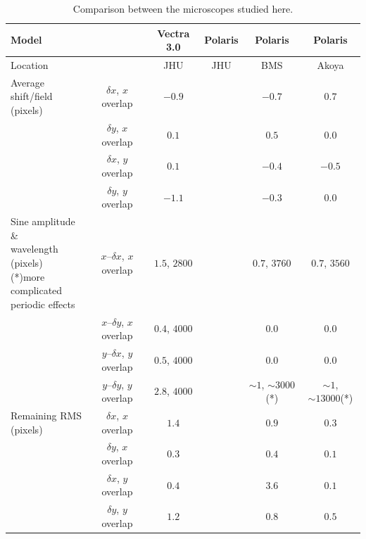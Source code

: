 \documentclass{article}
\begin{document}
\begin{table}[ht]
	\centering
	\begin{tabular}{|l|c|c|c|c|c|}
	\hline
	\multicolumn{2}{|l|}{Model} & Vectra 3.0 & Polaris & Polaris & Polaris \\\hline
	\multicolumn{2}{|l|}{Location} & JHU & JHU & BMS & Akoya \\\hline
	\multirowcell{3}[0pt][l]{Average shift/field \\ (pixels)}
	& $\delta x$, $x$ overlap & $-0.9$ & & $-0.7$ & $0.7$ \\\cline{2-6}
	& $\delta y$, $x$ overlap & $0.1$ & & $0.5$ & $0.0$ \\\cline{2-6}
	& $\delta x$, $y$ overlap & $0.1$ & & $-0.4$ & $-0.5$ \\\cline{2-6}
	& $\delta y$, $y$ overlap & $-1.1$ & & $-0.3$ & $0.0$ \\\hline
	\multirowcell{4}[0pt][l]{Sine amplitude \& \\wavelength (pixels)\\ (*)more complicated\\periodic effects}
	& $x$--$\delta x$, $x$ overlap & $1.5$, $2800$ & & $0.7$, $3760$ & $0.7$, $3560$ \\\cline{2-6}
	& $x$--$\delta y$, $x$ overlap & $0.4$, $4000$ & & $0.0$ & $0.0$ \\\cline{2-6}
	& $y$--$\delta x$, $y$ overlap & $0.5$, $4000$ & & $0.0$ & $0.0$ \\\cline{2-6}
	& $y$--$\delta y$, $y$ overlap & $2.8$, $4000$ & & $\sim1$, $\sim3000$(*) & $\sim1$, $\sim13000$(*) \\\hline
	\multirowcell{4}[0pt][l]{Remaining RMS\\(pixels)}
	& $\delta x$, $x$ overlap & $1.4$ & & $0.9$ & $0.3$ \\\cline{2-6}
	& $\delta y$, $x$ overlap & $0.3$ & & $0.4$ & $0.1$ \\\cline{2-6}
	& $\delta x$, $y$ overlap & $0.4$ & & $3.6$ & $0.1$ \\\cline{2-6}
	& $\delta y$, $y$ overlap & $1.2$ & & $0.8$ & $0.5$ \\\hline
	\end{tabular}
	\caption{Comparison between the microscopes studied here.}
	\label{table:microscopes}
\end{table}
\end{document}
